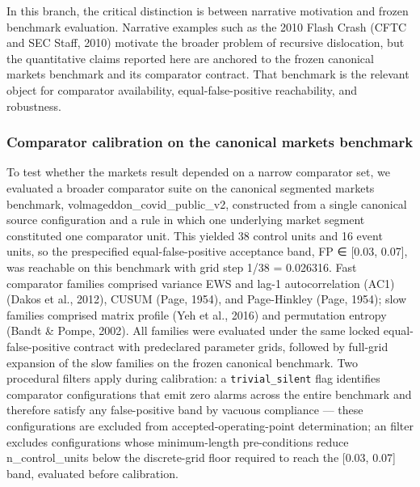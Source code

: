 \documentclass[
  11pt,
]{article}
\begin{document}
In this branch, the critical distinction is between narrative motivation
and frozen benchmark evaluation. Narrative examples such as the 2010
Flash Crash (CFTC and SEC Staff, 2010) motivate the broader problem of
recursive dislocation, but the quantitative claims reported here are
anchored to the frozen canonical markets benchmark and its comparator
contract. That benchmark is the relevant object for comparator
availability, equal-false-positive reachability, and robustness.

\subsubsection{Comparator calibration on the canonical markets
benchmark}\label{comparator-calibration-on-the-canonical-markets-benchmark}

To test whether the markets result depended on a narrow comparator set,
we evaluated a broader comparator suite on the canonical segmented
markets benchmark, volmageddon\_covid\_public\_v2, constructed from a
single canonical source configuration and a rule in which one underlying
market segment constituted one comparator unit. This yielded 38 control
units and 16 event units, so the prespecified equal-false-positive
acceptance band, FP ∈ {[}0.03, 0.07{]}, was reachable on this benchmark
with grid step 1/38 = 0.026316. Fast comparator families comprised
variance EWS and lag-1 autocorrelation (AC1) (Dakos et al., 2012), CUSUM
(Page, 1954), and Page-Hinkley (Page, 1954); slow families comprised
matrix profile (Yeh et al., 2016) and permutation entropy (Bandt \&
Pompe, 2002). All families were evaluated under the same locked
equal-false-positive contract with predeclared parameter grids, followed
by full-grid expansion of the slow families on the frozen canonical
benchmark. Two procedural filters apply during calibration: a
\texttt{trivial\_silent} flag identifies comparator configurations that
emit zero alarms across the entire benchmark and therefore satisfy any
false-positive band by vacuous compliance --- these configurations are
excluded from accepted-operating-point determination; an
\texttt{} filter excludes configurations whose
minimum-length pre-conditions reduce n\_control\_units below the
discrete-grid floor required to reach the {[}0.03, 0.07{]} band,
evaluated before calibration.
\end{document}
